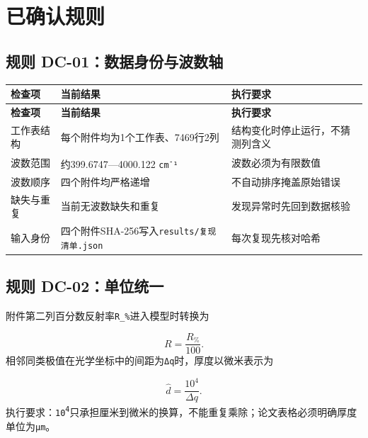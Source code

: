 \documentclass[11pt,a4paper]{ctexart}
\begin{document}
\section*{已确认规则}
\subsection*{规则 DC-01：数据身份与波数轴}
\begin{center}
\scriptsize
\begin{longtable}{|>{\raggedright\arraybackslash}p{}|>{\raggedright\arraybackslash}p{}|>{\raggedright\arraybackslash}p{}|}
\hline
\textbf{检查项} & \textbf{当前结果} & \textbf{执行要求} \\ \hline
\endfirsthead
\hline \textbf{检查项} & \textbf{当前结果} & \textbf{执行要求} \\ \hline
\endhead
工作表结构 & 每个附件均为1个工作表、7469行2列 & 结构变化时停止运行，不猜测列含义 \\ \hline
波数范围 & 约399.6747—4000.122 \texttt{cm\textsuperscript{-}¹} & 波数必须为有限数值 \\ \hline
波数顺序 & 四个附件均严格递增 & 不自动排序掩盖原始错误 \\ \hline
缺失与重复 & 当前无波数缺失和重复 & 发现异常时先回到数据核验 \\ \hline
输入身份 & 四个附件SHA-256写入\texttt{results/复现清单.json} & 每次复现先核对哈希 \\ \hline
\end{longtable}
\normalsize
\end{center}
\subsection*{规则 DC-02：单位统一}
附件第二列百分数反射率\texttt{R\_\%}进入模型时转换为


\[
R=\frac{R_{\%}}{100}.
\]
相邻同类极值在光学坐标中的间距为\texttt{Δq}时，厚度以微米表示为


\[
\hat d=\frac{10^4}{\Delta q}.
\]
执行要求：\texttt{10\textsuperscript{4}}只承担厘米到微米的换算，不能重复乘除；论文表格必须明确厚度单位为\texttt{μm}。
\end{document}
